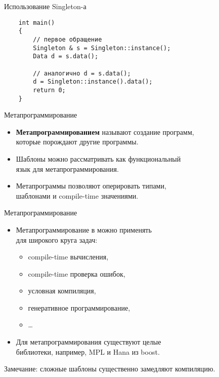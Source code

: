 \documentclass{beamer}
\begin{document}
\begin{frame}[fragile]{Использование Singleton-а}{}
\begin{lstlisting}
    int main()
    {
        // первое обращение
        Singleton & s = Singleton::instance();
        Data d = s.data();

        // аналогично d = s.data();
        d = Singleton::instance().data();
        return 0;    
    }
\end{lstlisting}
\end{frame}

\begin{frame}[fragile]{Метапрограммирование}
\begin{itemize}
    \item {\bf Метапрограммированием} называют создание программ, \\которые порождают другие программы.
    
    \item Шаблоны \langcpp можно рассматривать как функциональный\\ язык
    для метапрограммирования.
    
    \item Метапрограммы \langcpp позволяют оперировать типами, \\шаблонами и compile-time значениями.
\end{itemize}
\end{frame}

\begin{frame}[fragile]{Метапрограммирование}
\begin{itemize}    
    \item Метапрограммирование в \langcpp можно применять\\ для широкого круга задач:
    \begin{itemize}
        \item compile-time вычисления,
        \item compile-time проверка ошибок,
        \item условная компиляция,
        \item генеративное программирование,
        \item \ldots
    \end{itemize}
    \item Для метапрограммирования существуют целые\\ библиотеки,
    например, MPL и Hana из boost.
\end{itemize}
    Замечание: сложные шаблоны существенно замедляют компиляцию.
\end{frame}
\end{document}
